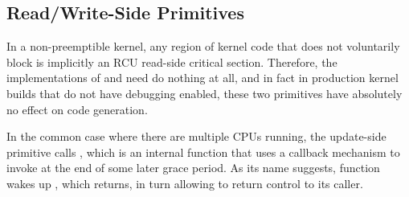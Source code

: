 \subsection{Read/Write-Side Primitives} \label{sec:api_impl}
In a non-preemptible kernel, any region of kernel code that does not voluntarily
block is implicitly an RCU read-side critical section.
Therefore, the implementations of  and
 need do nothing at all, and in fact
in production kernel builds that do not have debugging enabled,
these two primitives have absolutely no effect on code generation.


%
In the common case where there are multiple CPUs running,
%
the update-side primitive  calls
, which is an internal function that uses
a callback mechanism to invoke 
at the end of some later grace period.
As its name suggests,  function wakes up
, which returns, in turn allowing
 to return control to its caller.

